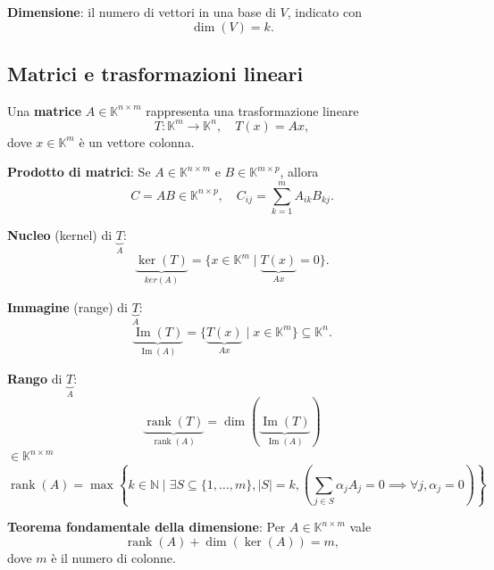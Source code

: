 \documentclass[12pt,a4paper]{article}
\begin{document}
\vspace{0.3cm}

\textbf{Dimensione}: il numero di vettori in una base di \( V \), indicato con  
\[
\dim(V) = k.
\]

\subsection*{Matrici e trasformazioni lineari}

Una \textbf{matrice} \( A \in \mathbb{K}^{n \times m} \) rappresenta una trasformazione lineare  
\[
T: \mathbb{K}^m \to \mathbb{K}^n, \quad T(x) = Ax,
\]
dove \( x \in \mathbb{K}^m \) è un vettore colonna.

\vspace{0.3cm}

\textbf{Prodotto di matrici}:  
Se \( A \in \mathbb{K}^{n \times m} \) e \( B \in \mathbb{K}^{m \times p} \), allora  
\[
C = AB \in \mathbb{K}^{n \times p}, \quad C_{ij} = \sum_{k=1}^m A_{ik} B_{kj}.
\]

\vspace{0.3cm}

\textbf{Nucleo} (kernel) di $\underbrace{T}_{A}$:  
\[
\underbrace{\ker(T)}_{ker(A)} = \{ x \in \mathbb{K}^m \mid \underbrace{T(x)}_{Ax} = 0 \}.
\]

\vspace{0.3cm}

\textbf{Immagine} (range) di $\underbrace{T}_{A}$:  
\[
\underbrace{\operatorname{Im}(T)}_{\operatorname{Im}(A)} = \{ \underbrace{T(x)}_{Ax} \mid x \in \mathbb{K}^m \} \subseteq \mathbb{K}^n.
\]


\vspace{0.3cm}

\textbf{Rango} di $\underbrace{T}_{A}$:  
\[
\underbrace{\operatorname{rank}(T)}_{\operatorname{rank}(A)} = \dim \left( \underbrace{\operatorname{Im}(T)}_{\operatorname{Im}(A)} \right)
\]
$\in\mathbb{K}^{n\times m}$
\[
\operatorname{rank}(A) = \max \left\{ k \in \mathbb{N} \mid \exists S \subseteq \{1, \ldots, m\}, |S| = k, \left( \sum_{j \in S} \alpha_j A_j = 0 \implies \forall j, \alpha_j = 0 \right) \right\}
\]

\vspace{0.3cm}

\textbf{Teorema fondamentale della dimensione}:  
Per \( A \in \mathbb{K}^{n \times m} \) vale  
\[
\operatorname{rank}(A) + \dim(\ker(A)) = m,
\]
dove \( m \) è il numero di colonne.
\end{document}
